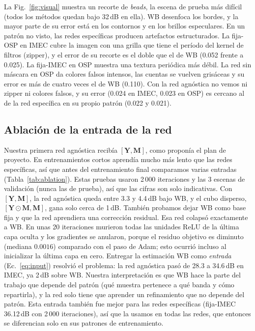 \documentclass{article}
\def\Y{{\mathbf Y}}
\def\M{{\mathbf M}}
\begin{document}
La Fig.~\ref{fig:visual} muestra un recorte de \textit{beads}, la escena de
prueba más difícil (todos los métodos quedan bajo 32\,dB en ella). WB
desenfoca los bordes, y la mayor parte de su error está en los contornos y
en los brillos especulares. En un patrón no visto, las redes específicas
producen artefactos estructurados. La fija-OSP en IMEC cubre la imagen con
una grilla que tiene el período del kernel de filtros (zipper), y el error
de su recorte es el doble que el de WB (0.052 frente a 0.025). La fija-IMEC
en OSP muestra una textura periódica más débil. La red sin máscara en OSP da
colores falsos intensos, las cuentas se vuelven grisáceas y su error es más
de cuatro veces el de WB (0.110). Con la red agnóstica no vemos ni zipper ni
colores falsos, y su error (0.024 en IMEC, 0.023 en OSP) es cercano al de la
red específica en su propio patrón (0.022 y 0.021).

\subsection{Ablación de la entrada de la red}
\label{sec:ablation}

Nuestra primera red agnóstica recibía $[\Y,\M]$, como proponía el plan de
proyecto. En entrenamientos cortos aprendía mucho más lento que las redes
específicas, así que antes del entrenamiento final comparamos varias
entradas (Tabla~\ref{tab:ablation}). Estas pruebas usaron 2\,000
iteraciones y las 3 escenas de validación (nunca las de prueba), así que las
cifras son solo indicativas. Con $[\Y,\M]$, la red agnóstica queda entre 3.3
y 4.4\,dB bajo WB, y el cubo disperso, $[\Y\odot\M,\M]$, gana solo cerca de
1\,dB. También probamos dejar WB como base fija y que la red aprendiera una
corrección residual. Esa red colapsó exactamente a WB. En unas 20
iteraciones murieron todas las unidades ReLU de la última capa oculta y los
gradientes se anularon, porque el residuo objetivo es diminuto (mediana
$0.0016$) comparado con el paso de Adam; esto ocurrió incluso al inicializar
la última capa en cero. Entregar la estimación WB como \emph{entrada}
(Ec.~\eqref{eq:input}) resolvió el problema: la red agnóstica pasó de 28.3 a
34.6\,dB en IMEC, ya 2\,dB sobre WB. Nuestra interpretación es que WB hace
la parte del trabajo que depende del patrón (qué muestra pertenece a qué
banda y cómo repartirla), y la red solo tiene que aprender un refinamiento
que no depende del patrón. Esta entrada también fue mejor para las redes
específicas (fija-IMEC 36.12\,dB con 2\,000 iteraciones), así que la usamos
en todas las redes, que entonces se diferencian solo en sus patrones de
entrenamiento.
\end{document}
